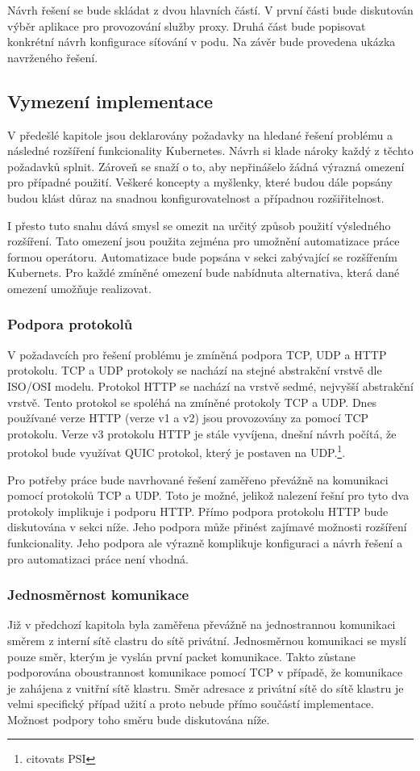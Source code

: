 Návrh řešení se bude skládat z dvou hlavních částí. V první části bude diskutován výběr aplikace pro provozování služby proxy. Druhá část bude popisovat konkrétní návrh konfigurace síťování v podu. Na závěr bude provedena ukázka navrženého řešení.

\subsection{Vymezení implementace}
V předešlé kapitole jsou deklarovány požadavky na hledané řešení problému a následné rozšíření funkcionality Kubernetes. Návrh si klade nároky každý z těchto požadavků splnit. Zároveň se snaží o to, aby nepřinášelo žádná výrazná omezení pro případné použití. Veškeré koncepty a myšlenky, které budou dále popsány budou klást důraz na snadnou konfigurovatelnost a případnou rozšiřitelnost.

I přesto tuto snahu dává smysl se omezit na určitý způsob použití výsledného rozšíření. Tato omezení jsou použita zejména pro umožnění automatizace práce formou operátoru. Automatizace bude popsána v sekci \label{sec:operator} zabývající se rozšířením Kubernets. Pro každé zmíněné omezení bude nabídnuta alternativa, která dané omezení umožňuje realizovat. 

\subsubsection*{Podpora protokolů}
V požadavcích pro řešení problému je zmíněná podpora TCP, UDP a HTTP protokolu. TCP a UDP protokoly se nachází na stejné abstrakční vrstvě dle ISO/OSI modelu. Protokol HTTP se nachází na vrstvě sedmé, nejvyšší abstrakční vrstvě. Tento protokol se spoléhá na zmíněné protokoly TCP a UDP. Dnes používané verze HTTP (verze v1 a v2) jsou provozovány za pomocí TCP protokolu. Verze v3 protokolu HTTP je stále vyvíjena, dnešní návrh počítá, že protokol bude využívat QUIC protokol, který je postaven na UDP.\footnote{citovats PSI}.

Pro potřeby práce bude navrhované řešení zaměřeno převážně na komunikaci pomocí protokolů TCP a UDP. Toto je možné, jelikož nalezení řešní pro tyto dva protokoly implikuje i podporu HTTP. Přímo podpora protokolu HTTP bude diskutována v sekci níže. Jeho podpora může přinést zajímavé možnosti rozšíření funkcionality. Jeho podpora ale výrazně komplikuje konfiguraci a návrh řešení a pro automatizaci práce není vhodná.

\subsubsection*{Jednosměrnost komunikace}
Již v předchozí kapitola byla zaměřena převážně na jednostrannou komunikaci směrem z interní sítě clastru do sítě privátní. Jednosměrnou komunikaci se myslí pouze směr, kterým je vyslán první packet komunikace. Takto zůstane podporována oboustrannost komunikace pomocí TCP v případě, že komunikace je zahájena z vnitřní sítě klastru. Směr adresace z privátní sítě do sítě klastru je velmi specifický případ užití a proto nebude přímo součástí implementace. Možnost podpory toho směru bude diskutována níže.

